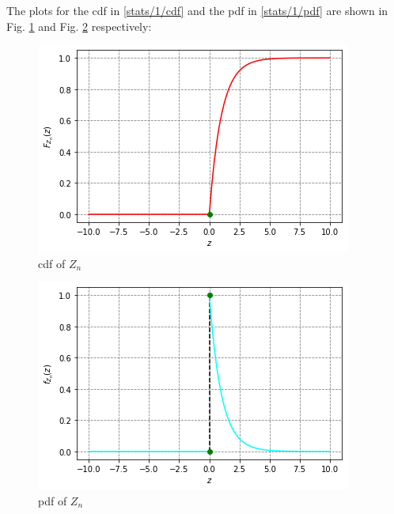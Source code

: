 The plots for the cdf in \eqref{stats/1/cdf} and the pdf in \eqref{stats/1/pdf} are shown in Fig. \ref{stats/1/fig_cdf} and Fig. \ref{stats/1/fig_pdf} respectively:
\begin{figure}[!ht]
    \centering
    \includegraphics[width=\columnwidth]{stats/solutions/1/figures/cdf.png}
    \caption{cdf of $Z_n$}
    \label{stats/1/fig_cdf}
\end{figure}
\begin{figure}[!ht]
    \centering
    \includegraphics[width=\columnwidth]{stats/solutions/1/figures/pdf.png}
    \caption{pdf of $Z_n$}
    \label{stats/1/fig_pdf}
\end{figure}



